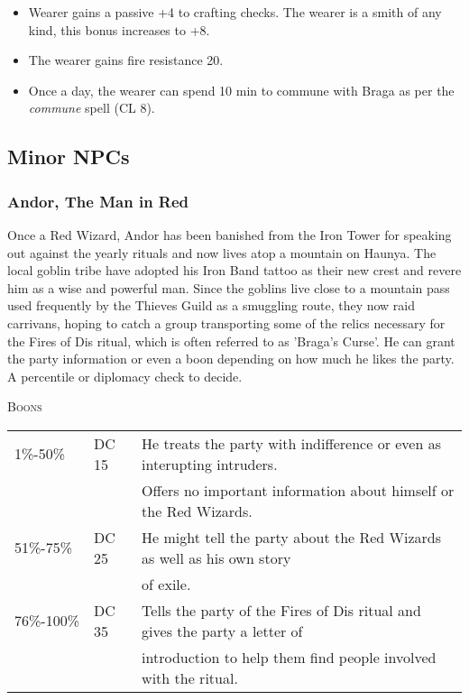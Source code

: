 			\begin{itemize}
				\item Wearer gains a passive +4 to crafting checks.  The wearer 
				is a smith of any kind, this bonus increases to +8.  
				\item The wearer gains fire resistance 20.
				\item Once a day, the wearer can spend 10 min to commune with Braga
				as per the \textit{commune} spell (CL 8).  
			\end{itemize}

	\subsection{Minor NPCs}

		\subsubsection{Andor, The Man in Red}

		Once a Red Wizard, Andor has been banished from the Iron Tower
		for speaking out against the yearly rituals and now lives atop
		a mountain on Haunya.  The local goblin tribe have adopted his
		Iron Band tattoo as their new crest and revere him as a wise 
		and powerful man.  Since the goblins live close to a mountain
		pass used frequently by the Thieves Guild as a smuggling route,
		they now raid carrivans, hoping to catch a group transporting
		some of the relics necessary for the Fires of Dis ritual, which
		is often referred to as 'Braga's Curse'.  He can grant the party 
		information or even a boon depending on how much he likes the 
		party.  A percentile or diplomacy check to decide.  

		\textsc{Boons}

		\begin{tabularx}{\textwidth}{| X | X | X |}
			\hline
			1\%-50\% & DC 15 & He treats the party with indifference 
						or even as interupting intruders. \\
 					& & Offers no important information about 
						himself or the Red Wizards. \\
			\hline
			51\%-75\% & DC 25 & He might tell the party about the Red
						Wizards as well as his own story \\ 
					& & 	of exile. \\
			\hline	
			76\%-100\% & DC 35 & Tells the party of the Fires of Dis 
						ritual and gives the party a letter of \\
					& &	introduction to help them find people 
						involved with the ritual. \\ 		
			\hline
		\end{tabularx}

